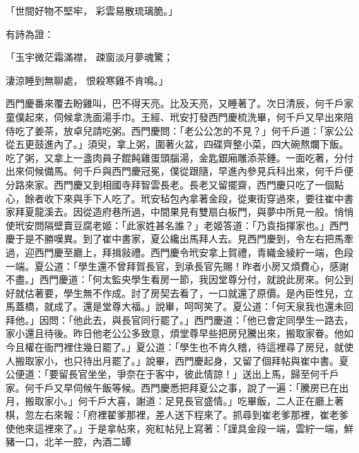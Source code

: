 「世間好物不堅牢，  彩雲易散琉璃脆。」

有詩為證：

「玉宇微茫霜滿襟，  疎窗淡月夢魂驚；

淒涼睡到無聊處，  恨殺寒雞不肯鳴。」

西門慶番來覆去盼雞叫，巴不得天亮。比及天亮，又睡著了。次日清辰，何千戶家童僕起來，伺候拿洗面湯手巾。王經、玳安打發西門慶梳洗畢，何千戶又早出來陪侍吃了姜茶，放卓兒請吃粥。西門慶問：「老公公怎的不見？」何千戶道：「家公公從五更鼓進內了。」須臾，拿上粥，圍著火盆，四碟齊整小菜，四大碗熬爛下飯。吃了粥，又拿上一盞肉員子餛飩雞蛋頭腦湯，金匙銀廂雕添茶鍾。一面吃著，分付出來伺候備馬。何千戶與西門慶冠冕，僕從跟隨，早進內參見兵科出來，何千戶便分路來家。西門慶又到相國寺拜智雲長老。長老又留擺齋，西門慶只吃了一個點心，餘者收下來與手下人吃了。玳安毡包內拿著金段，從東街穿過來，要往崔中書家拜夏龍溪去。因從造府巷所過，中間果見有雙扇白板門，與夢中所見一般。悄悄使玳安問隔壁賣豆腐老姬：「此家姓甚名誰？」老姬答道：「乃袁指揮家也。」西門慶于是不勝嘆異。到了崔中書家，夏公纔出馬拜人去。見西門慶到，令左右把馬牽過，迎西門慶至廳上，拜揖敍禮。西門慶令玳安拿上賀禮，青織金綾紵一端，色段一端。夏公道：「學生還不曾拜賀長官，到承長官先賜！昨者小房又煩費心，感謝不盡。」西門慶道：「何太監央學生看房一節，我因堂尊分付，就說此房來。何公到好就估著要，學生無不作成。討了房契去看了，一口就還了原價。是內臣性兒，立馬蓋橋，就成了。還是堂尊大福。」說畢，呵呵笑了。夏公道：「何天泉我也還未回拜他。」因問：「他此去，與長官同行罷了。」西門慶道：「他已會定同學生一路去，家小還且待後。昨日他老公公多致意，煩堂尊早些把房兒騰出來，搬取家眷。他如今且權在衙門裡住幾日罷了。」夏公道：「學生也不肯久稽，待這裡尋了房兒，就使人搬取家小，也只待出月罷了。」說畢，西門慶起身，又留了個拜帖與崔中書。夏公便道：「要留長官坐坐，爭奈在于客中，彼此情諒！」送出上馬，歸至何千戶家。何千戶又早伺候午飯等候。西門慶悉把拜夏公之事，說了一遍：「騰房已在出月，搬取家小。」何千戶大喜，謝道：足見長官盛情。」吃畢飯，二人正在廳上著棋，忽左右來報：「府裡翟爹那裡，差人送下程來了。抓尋到崔老爹那裡，崔老爹使他來這裡來了。」于是拿帖來，宛紅帖兒上寫著：「謹具金段一端，雲紵一端，鮮豬一口，北羊一腔，內酒二罈 